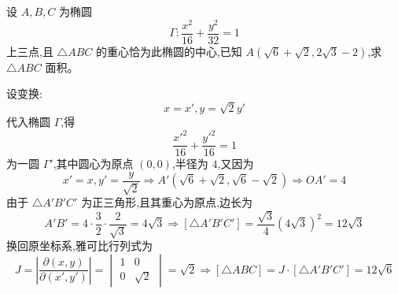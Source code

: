 \begin{questions}

    \question 设 $A,B,C$ 为椭圆 
    \[
    \Gamma: \frac{x^{2}}{16}+\frac{y^{2}}{32}=1
    \] 
    上三点,且 $\triangle ABC$ 的重心恰为此椭圆的中心,已知 $A(\sqrt{6}+\sqrt{2},2\sqrt{3}-2)$,求 $\triangle ABC$ 面积。
    \begin{solution}
        设变换:
        \[
        x = x', y = \sqrt{2}y'
        \]
        代入椭圆 $\Gamma$,得
        \[
        \frac{x'^2}{16} + \frac{y'^2}{16} = 1
        \]
        为一圆 $\Gamma'$,其中圆心为原点 $(0, 0)$,半径为 $4$,又因为
        \[
        x' = x, y' = \frac{y}{\sqrt{2}}
        \Rightarrow A'(\sqrt{6}+\sqrt{2}, \sqrt{6}-\sqrt{2})
        \Rightarrow OA' = 4
        \]
        由于 $\triangle A'B'C'$ 为正三角形,且其重心为原点,边长为
        \[
        A'B' = 4 \cdot \frac{3}{2} \cdot \frac{2}{\sqrt{3}} = 4\sqrt{3}
        \Rightarrow [\triangle A'B'C'] = \frac{\sqrt{3}}{4}(4\sqrt{3})^2 = 12\sqrt{3}
        \]
        换回原坐标系,雅可比行列式为
        \[
        J = \left| \frac{\partial(x, y)}{\partial(x', y')} \right| = 
        \begin{vmatrix}
        1 & 0\\
        0 & \sqrt{2}
        \end{vmatrix} = \sqrt{2}
        \Rightarrow [\triangle ABC] = J \cdot [\triangle A'B'C'] = 12\sqrt{6}
        \]
    \end{solution}


\end{questions}
